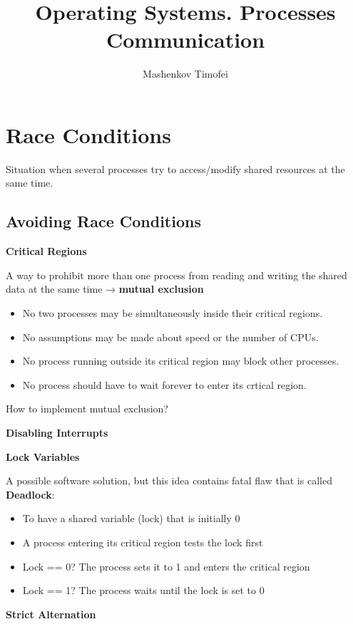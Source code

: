 \documentclass{article}
\title{Operating Systems. Processes Communication}
\author{Mashenkov Timofei}
\begin{document}
\maketitle{}

\section*{Race Conditions}

Situation when several processes try to access/modify shared resources at the same time.

\subsection*{Avoiding Race Conditions}

\textbf{Critical Regions}

A way to prohibit more than one process from reading and writing the shared data at the same time → \textbf{mutual
exclusion}

\begin{itemize}
  \item No two processes may be simultaneously inside their critical regions.
  \item No assumptions may be made about speed or the number of CPUs.
  \item No process running outside its critical region may block other processes.
  \item No process should have to wait forever to enter its crtical region.
\end{itemize}

How to implement mutual exclusion?

\textbf{Disabling Interrupts}

\textbf{Lock Variables}

A possible software solution, but this idea contains fatal flaw that is called \textbf{Deadlock}:

\begin{itemize}
  \item To have a shared variable (lock) that is initially 0
  \item A process entering its critical region tests the lock first
  \item Lock == 0? The process sets it to 1 and enters the critical region
  \item Lock == 1? The process waits until the lock is set to 0
\end{itemize}

\textbf{Strict Alternation}
\end{document}
